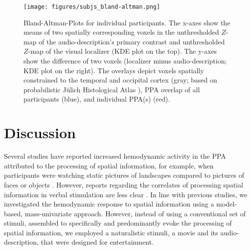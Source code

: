 \documentclass[english]{article}
\begin{document}
\begin{figure*}[tbp]
\centering
    \texttt{[image: figures/subjs\_bland-altman.png]}
    \caption{Bland-Altman-Plots for individual participants.
    The x-axes show the means of two spatially corresponding voxels in the
    unthresholded $Z$-map of the audio-description's primary contrast and
    unthresholded $Z$-map of the visual localizer (KDE plot on the top).
    The y-axes show the difference of two voxels (localizer minus
    audio-description; KDE plot on the right).
    The overlays depict voxels spatially constrained to the
    temporal and occipital cortex (gray; based on probabilistic Jülich
    Histological Atlas \citep{eickhoff2005toolbox, eickhoff2007assignment}),
    PPA overlap of all participants (blue),
    and individual PPA(s) (red).}
    \label{fig:bland-altman}
\end{figure*}


\section{Discussion}





Several studies have reported increased hemodynamic activity in the PPA
attributed to the processing of spatial information, for example, when
participants were watching static pictures of landscapes compared to pictures of
faces or objects \citep[e.g.,][]{epstein1998ppa, epstein1999parahippocampal}.
However, reports regarding the correlates of processing spatial information in
verbal stimulation are less clear \citep{aziz2008modulation}.
In line with previous studies, we investigated the hemodynamic response to
spatial information using a model-based, mass-univariate approach.
However, instead of using a conventional set of stimuli, assembled to
specifically and predominantly evoke the processing of spatial information, we
employed a naturalistic stimuli, a movie and its audio-description, that were
designed for entertainment.
\end{document}

